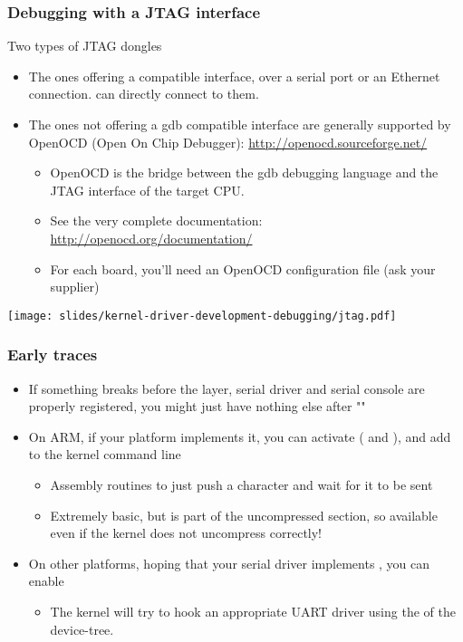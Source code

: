 \begin{frame}
  \frametitle{Debugging with a JTAG interface}
  Two types of JTAG dongles
  \begin{itemize}
  \item The ones offering a  compatible interface, over a
    serial port or an Ethernet connection.  can directly
    connect to them.
  \item The ones not offering a gdb compatible interface are generally
    supported by OpenOCD (Open On Chip Debugger):
    \url{http://openocd.sourceforge.net/}
    \begin{itemize}
    \item OpenOCD is the bridge between the gdb debugging language
      and the JTAG interface of the target CPU.
    \item See the very complete documentation:
      \url{http://openocd.org/documentation/}
    \item For each board, you'll need an OpenOCD configuration file
      (ask your supplier)
    \end{itemize}
  \end{itemize}
   \begin{center}
     \texttt{[image: slides/kernel-driver-development-debugging/jtag.pdf]}
   \end{center}
\end{frame}

\begin{frame}
  \frametitle{Early traces}
  \begin{itemize}
  \item If something breaks before the  layer, serial driver
    and serial console are properly registered, you might just have
    nothing else after ""
  \item On ARM, if your platform implements it, you can activate
    ( and ), and add
     to the kernel command line
    \begin{itemize}
    \item Assembly routines to just push a character and wait for it to
      be sent
    \item Extremely basic, but is part of the uncompressed section, so
      available even if the kernel does not uncompress correctly!
    \end{itemize}
  \item On other platforms, hoping that your serial driver implements
    , you can enable 
    \begin{itemize}
    \item The kernel will try to hook an appropriate 
      UART driver using the  of the device-tree.
    \end{itemize}
  \end{itemize}
\end{frame}

